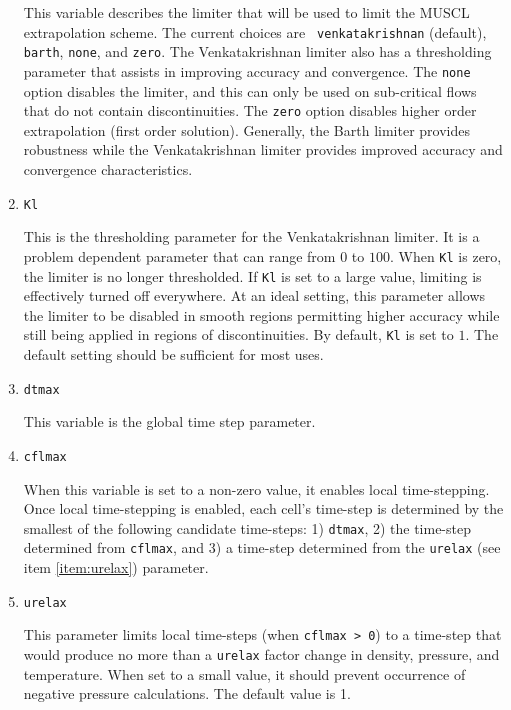\documentclass{article}
\begin{document}
\begin{enumerate}
  This variable describes the limiter that will be used to limit the
  MUSCL extrapolation scheme.  The current choices are {\tt
    venkatakrishnan} (default), {\tt barth}, {\tt none}, and {\tt zero}.  
  The Venkatakrishnan limiter also has a thresholding parameter
  that assists in improving accuracy and convergence.  The {\tt none}
  option disables the limiter, and this can only be used on
  sub-critical flows that do not contain discontinuities.  The
  {\tt zero} option disables higher order extrapolation (first order solution).
  Generally, the Barth limiter provides robustness while the Venkatakrishnan
  limiter provides improved accuracy and convergence characteristics.
  
\item {\tt Kl}
  
  This is the thresholding parameter for the Venkatakrishnan limiter.
  It is a problem dependent parameter that can range from $0$ to
  $100$.  When {\tt Kl} is zero, the limiter is no longer
  thresholded.  If {\tt Kl} is set to a large value, limiting is
  effectively turned off everywhere.  At an ideal setting, this
  parameter allows the limiter to be disabled in smooth regions
  permitting higher accuracy while still being applied in regions of
  discontinuities.  By default, {\tt Kl} is set to $1$.  The default
  setting should be sufficient for most uses.

\item {\tt dtmax}
  
  This variable is the global time step parameter.  

\item {\tt cflmax} 
  
  When this variable is set to a non-zero value, it enables local
  time-stepping.  Once local time-stepping is enabled, each cell's
  time-step is determined by the smallest of the following
  candidate time-steps:  1) {\tt dtmax}, 2) the time-step determined
  from {\tt cflmax}, and 3) a time-step determined from the {\tt urelax}
  (see item \ref{item:urelax}) parameter.

\item {\tt urelax} \label{item:urelax}

  This parameter limits local time-steps (when {\tt cflmax > 0})
  to a time-step that would produce no more than a {\tt urelax} factor
  change in density, pressure, and temperature.  When set to a small
  value, it should prevent occurrence of negative pressure calculations.
  The default value is 1.


\end{enumerate}
\end{document}
